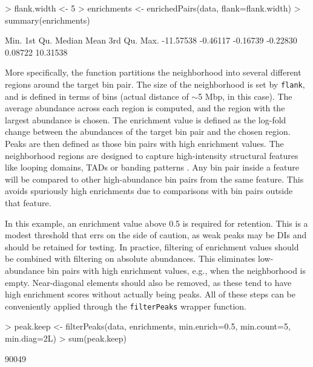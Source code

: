 \documentclass[12pt]{report}
\renewenvironment{Schunk}{\vspace{0pt}}{\vspace{0pt}}
\newcommand{\code}[1]{{\small\texttt{#1}}}
\begin{document}
\begin{Schunk}
\begin{Sinput}
> flank.width <- 5
> enrichments <- enrichedPairs(data, flank=flank.width)
> summary(enrichments)   
\end{Sinput}
\begin{Soutput}
     Min.   1st Qu.    Median      Mean   3rd Qu.      Max. 
-11.57538  -0.46117  -0.16739  -0.22830   0.08722  10.31538 
\end{Soutput}
\end{Schunk}

More specifically, the function partitions the neighborhood into several different regions around the target bin pair.
The size of the neighborhood is set by \code{flank}, and is defined in terms of bins (actual distance of $\sim$5 Mbp, in this case).
The average abundance across each region is computed, and the region with the largest abundance is chosen.
The enrichment value is defined as the log-fold change between the abundances of the target bin pair and the chosen region.
Peaks are then defined as those bin pairs with high enrichment values.
The neighborhood regions are designed to capture high-intensity structural features like looping domains, TADs or banding patterns \citep{rao2014kilobase}.
Any bin pair inside a feature will be compared to other high-abundance bin pairs from the same feature.
This avoids spuriously high enrichments due to comparisons with bin pairs outside that feature.

In this example, an enrichment value above 0.5 is required for retention.
This is a modest threshold that errs on the side of caution, as weak peaks may be DIs and should be retained for testing.
In practice, filtering of enrichment values should be combined with filtering on absolute abundances.
This eliminates low-abundance bin pairs with high enrichment values, e.g., when the neighborhood is empty.
Near-diagonal elements should also be removed, as these tend to have high enrichment scores without actually being peaks.
All of these steps can be conveniently applied through the \code{filterPeaks} wrapper function.

\begin{Schunk}
\begin{Sinput}
> peak.keep <- filterPeaks(data, enrichments, min.enrich=0.5, min.count=5, min.diag=2L)
> sum(peak.keep)
\end{Sinput}
\begin{Soutput}
[1] 90049
\end{Soutput}
\end{Schunk}
\end{document}
